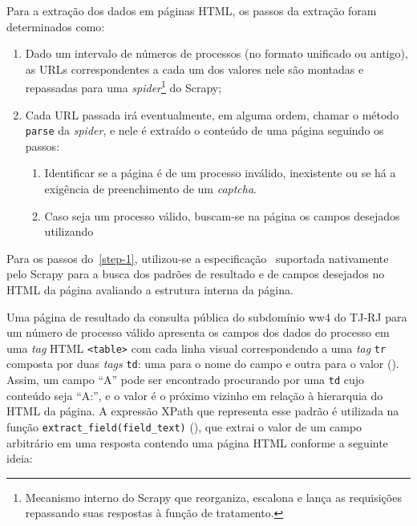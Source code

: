 Para a extração dos dados em páginas HTML, os passos da extração foram
determinados como:

\begin{enumerate}
    \item Dado um intervalo de números de processos (no formato unificado ou
        antigo), as URLs correspondentes a cada um dos valores nele são
        montadas e repassadas para uma \textit{spider}\footnote{Mecanismo
        interno do Scrapy que reorganiza, escalona e lança as requisições
        repassando suas respostas à função de tratamento.} do Scrapy;
    \item \label{step-1} Cada URL passada irá eventualmente, em alguma ordem, chamar o método
        \texttt{parse} da \textit{spider}, e nele é extraído o conteúdo de uma
        página seguindo os passos:

        \begin{enumerate}
            \item Identificar se a página é de um processo inválido,
                inexistente ou se há a exigência de preenchimento de um
                \textit{captcha}.
            \item Caso seja um processo válido, buscam-se na página os campos
                desejados utilizando
        \end{enumerate}
\end{enumerate}

Para os passos do~\cref{step-1}, utilizou-se a especificação~\cite{spec:xpath}
suportada nativamente pelo Scrapy para a busca dos padrões de resultado e de
campos desejados no HTML da página avaliando a estrutura interna da página.

Uma página de resultado da consulta pública do subdomínio ww4 do TJ-RJ para um
número de processo válido apresenta os campos dos dados do processo em uma
\textit{tag} HTML \texttt{<table>} com cada linha visual correspondendo a uma
\textit{tag} \texttt{tr} composta por duas \textit{tags} \texttt{td}: uma para
o nome do campo e outra para o valor (). Assim, um campo
``A'' pode ser encontrado procurando por uma \texttt{td} cujo conteúdo seja
``A:'', e o valor é o próximo vizinho em relação à hierarquia do HTML da
página. A expressão XPath que representa esse padrão é utilizada na função
\texttt{extract_field(field_text)} (), que
extrai o valor de um campo arbitrário em uma resposta contendo uma página HTML
conforme a seguinte ideia:

